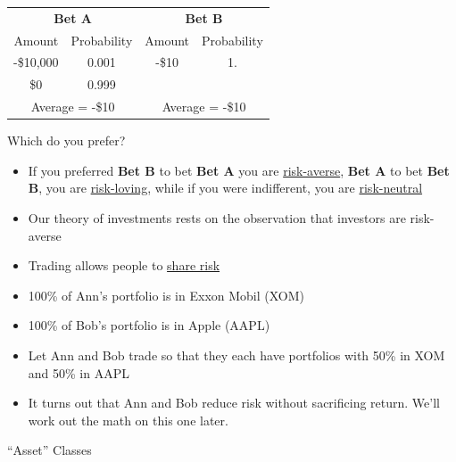 \documentclass{beamer}
\renewcommand{\arraystretch}{1.5}
\begin{document}
\begin{frame}{}
	\begin{center}
		\renewcommand{\arraystretch}{1.5}
		\begin{tabular}{cc|cc}
			\multicolumn{2}{c}{\textbf{Bet A}} & \multicolumn{2}{c}{\textbf{Bet B}} \\
			Amount & Probability & Amount & Probability \\ \hline
			-\$10,000 & 0.001 & -\$10 & 1. \\
			\$0 & 0.999 & & \\ \hline
			\multicolumn{2}{c}{Average = -\$10} & \multicolumn{2}{c}{Average = -\$10}
		\end{tabular}
	\end{center}
\begin{center}
Which do you prefer?
\end{center}
\pause
\begin{itemize}
	\item If you preferred \textbf{Bet B} to bet \textbf{Bet A} you are \underline{risk-averse}, \textbf{Bet A} to bet \textbf{Bet B}, you are \underline{risk-loving}, while if you were indifferent, you are \underline{risk-neutral}
	\item Our theory of investments rests on the observation that investors are risk-averse
\end{itemize}
\end{frame}

\begin{frame}{}
	\begin{itemize}
		\item Trading allows people to \underline{share risk}
		\item 100\% of Ann’s portfolio is in Exxon Mobil (XOM)
		\item 100\% of Bob’s portfolio is in Apple (AAPL)
		\item Let Ann and Bob trade so that they each have portfolios with 50\% in XOM and 50\% in AAPL
		\item It turns out that Ann and Bob reduce risk without sacrificing return. We’ll work out the math on this one later.
	\end{itemize}
\end{frame}

\begin{frame}
\begin{center}
\Huge ``Asset'' Classes
\end{center}
\end{frame}
\end{document}
